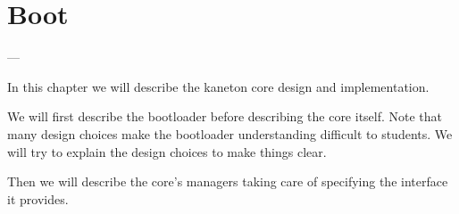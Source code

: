 
%
%

\chapter{Boot}

---

In this chapter we will describe the kaneton core design and implementation.

We will first describe the bootloader before describing the core itself.
Note that many design choices make the bootloader understanding difficult
to students. We will try to explain the design choices to make things
clear.

Then we will describe the core's managers taking care of specifying the
interface it provides.

\newpage

%
%

